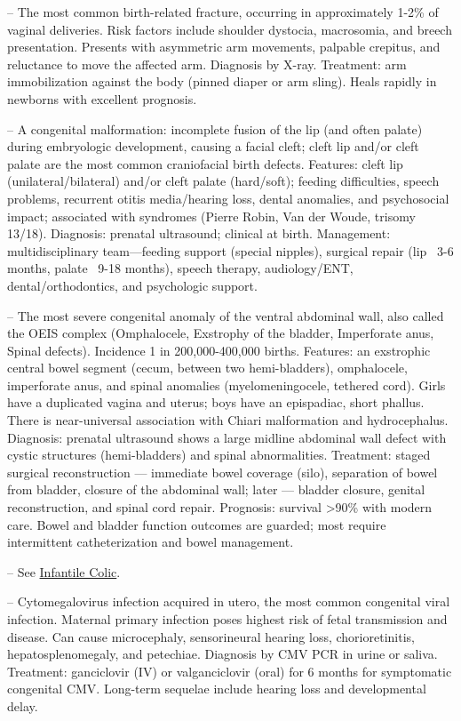 -- The most common birth-related fracture, occurring in approximately 1-2\% of vaginal deliveries. Risk factors include shoulder dystocia, macrosomia, and breech presentation. Presents with asymmetric arm movements, palpable crepitus, and reluctance to move the affected arm. Diagnosis by X-ray. Treatment: arm immobilization against the body (pinned diaper or arm sling). Heals rapidly in newborns with excellent prognosis.

-- A congenital malformation: incomplete fusion of the lip (and often palate) during embryologic development, causing a facial cleft; cleft lip and/or cleft palate are the most common craniofacial birth defects. Features: cleft lip (unilateral/bilateral) and/or cleft palate (hard/soft); feeding difficulties, speech problems, recurrent otitis media/hearing loss, dental anomalies, and psychosocial impact; associated with syndromes (Pierre Robin, Van der Woude, trisomy 13/18). Diagnosis: prenatal ultrasound; clinical at birth. Management: multidisciplinary team—feeding support (special nipples), surgical repair (lip ~3-6 months, palate ~9-18 months), speech therapy, audiology/ENT, dental/orthodontics, and psychologic support.

-- The most severe congenital anomaly of the ventral abdominal wall, also called the OEIS complex (Omphalocele, Exstrophy of the bladder, Imperforate anus, Spinal defects). Incidence 1 in 200,000-400,000 births. Features: an exstrophic central bowel segment (cecum, between two hemi-bladders), omphalocele, imperforate anus, and spinal anomalies (myelomeningocele, tethered cord). Girls have a duplicated vagina and uterus; boys have an epispadiac, short phallus. There is near-universal association with Chiari malformation and hydrocephalus. Diagnosis: prenatal ultrasound shows a large midline abdominal wall defect with cystic structures (hemi-bladders) and spinal abnormalities. Treatment: staged surgical reconstruction — immediate bowel coverage (silo), separation of bowel from bladder, closure of the abdominal wall; later — bladder closure, genital reconstruction, and spinal cord repair. Prognosis: survival >90\% with modern care. Bowel and bladder function outcomes are guarded; most require intermittent catheterization and bowel management.

-- See \hyperlink{Infantile Colic}{Infantile Colic}.

-- Cytomegalovirus infection acquired in utero, the most common congenital viral infection. Maternal primary infection poses highest risk of fetal transmission and disease. Can cause microcephaly, sensorineural hearing loss, chorioretinitis, hepatosplenomegaly, and petechiae. Diagnosis by CMV PCR in urine or saliva. Treatment: ganciclovir (IV) or valganciclovir (oral) for 6 months for symptomatic congenital CMV. Long-term sequelae include hearing loss and developmental delay.

